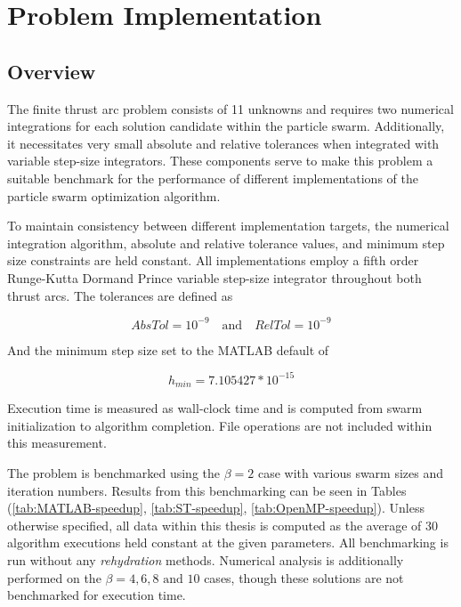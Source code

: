 \chapter{Problem Implementation}
\section{Overview}
\noindent The finite thrust arc problem consists of 11 unknowns and requires two numerical integrations for each solution candidate within the
particle swarm. Additionally, it necessitates very small absolute and relative tolerances when integrated with variable step-size integrators. These
components serve to make this problem a suitable benchmark for the performance of different implementations of the particle swarm optimization algorithm. \newline

\noindent To maintain consistency between different implementation targets, the numerical integration algorithm, absolute and relative tolerance values,
and minimum step size constraints are held constant. All implementations employ a fifth order Runge-Kutta Dormand Prince variable step-size integrator
throughout both thrust arcs. The tolerances are defined as

\begin{equation}
AbsTol = 10^{-9} \quad \text{and} \quad RelTol = 10^{-9} 
\label{eq:tolerances}
\end{equation}

\noindent And the minimum step size set to the MATLAB default of

\begin{equation}
    h_{min} = 7.105427*10^{-15}
    \label{eq:min-step-size}
\end{equation}

\noindent Execution time is measured as wall-clock time and is computed from swarm initialization 
to algorithm completion. File operations are not included within this measurement. \newline

\noindent The problem is benchmarked using the $\beta = 2$ case with various swarm sizes and iteration numbers. 
Results from this benchmarking can be seen in Tables (\ref{tab:MATLAB-speedup}, \ref{tab:ST-speedup}, \ref{tab:OpenMP-speedup}). Unless otherwise 
specified, all data within this thesis is computed as the average of 30 algorithm executions held constant at the given parameters. 
All benchmarking is run without any \textit{rehydration} methods.
Numerical analysis is additionally performed on the $\beta=4,6,8 \text{ and } 10$ cases, though these solutions are not benchmarked for execution time.

